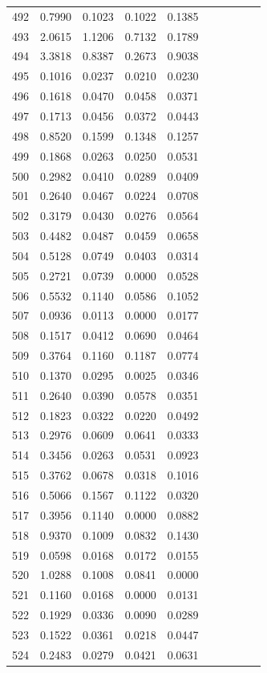 \begin{table}
\begin{tabular}{cccccccccc}
492& 0.7990& 0.1023& 0.1022& 0.1385\\ 
493& 2.0615& 1.1206& 0.7132& 0.1789\\ 
494& 3.3818& 0.8387& 0.2673& 0.9038\\ 
495& 0.1016& 0.0237& 0.0210& 0.0230\\ 
496& 0.1618& 0.0470& 0.0458& 0.0371\\ 
497& 0.1713& 0.0456& 0.0372& 0.0443\\ 
498& 0.8520& 0.1599& 0.1348& 0.1257\\ 
499& 0.1868& 0.0263& 0.0250& 0.0531\\ 
500& 0.2982& 0.0410& 0.0289& 0.0409\\ 
501& 0.2640& 0.0467& 0.0224& 0.0708\\ 
502& 0.3179& 0.0430& 0.0276& 0.0564\\ 
503& 0.4482& 0.0487& 0.0459& 0.0658\\ 
504& 0.5128& 0.0749& 0.0403& 0.0314\\ 
505& 0.2721& 0.0739& 0.0000& 0.0528\\ 
506& 0.5532& 0.1140& 0.0586& 0.1052\\ 
507& 0.0936& 0.0113& 0.0000& 0.0177\\ 
508& 0.1517& 0.0412& 0.0690& 0.0464\\ 
509& 0.3764& 0.1160& 0.1187& 0.0774\\ 
510& 0.1370& 0.0295& 0.0025& 0.0346\\ 
511& 0.2640& 0.0390& 0.0578& 0.0351\\ 
512& 0.1823& 0.0322& 0.0220& 0.0492\\ 
513& 0.2976& 0.0609& 0.0641& 0.0333\\ 
514& 0.3456& 0.0263& 0.0531& 0.0923\\ 
515& 0.3762& 0.0678& 0.0318& 0.1016\\ 
516& 0.5066& 0.1567& 0.1122& 0.0320\\ 
517& 0.3956& 0.1140& 0.0000& 0.0882\\ 
518& 0.9370& 0.1009& 0.0832& 0.1430\\ 
519& 0.0598& 0.0168& 0.0172& 0.0155\\ 
520& 1.0288& 0.1008& 0.0841& 0.0000\\ 
521& 0.1160& 0.0168& 0.0000& 0.0131\\ 
522& 0.1929& 0.0336& 0.0090& 0.0289\\ 
523& 0.1522& 0.0361& 0.0218& 0.0447\\ 
524& 0.2483& 0.0279& 0.0421& 0.0631\\ 

\end{tabular}
\end{table}
